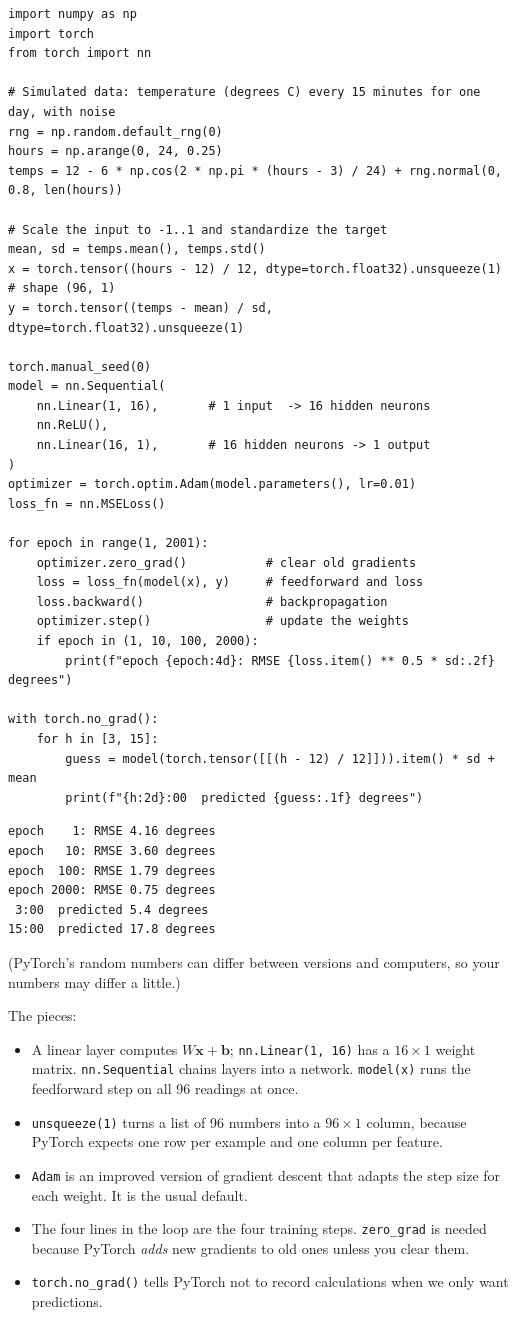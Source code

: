 \begin{verbatim}
import numpy as np
import torch
from torch import nn

# Simulated data: temperature (degrees C) every 15 minutes for one day, with noise
rng = np.random.default_rng(0)
hours = np.arange(0, 24, 0.25)
temps = 12 - 6 * np.cos(2 * np.pi * (hours - 3) / 24) + rng.normal(0, 0.8, len(hours))

# Scale the input to -1..1 and standardize the target
mean, sd = temps.mean(), temps.std()
x = torch.tensor((hours - 12) / 12, dtype=torch.float32).unsqueeze(1)   # shape (96, 1)
y = torch.tensor((temps - mean) / sd, dtype=torch.float32).unsqueeze(1)

torch.manual_seed(0)
model = nn.Sequential(
    nn.Linear(1, 16),       # 1 input  -> 16 hidden neurons
    nn.ReLU(),
    nn.Linear(16, 1),       # 16 hidden neurons -> 1 output
)
optimizer = torch.optim.Adam(model.parameters(), lr=0.01)
loss_fn = nn.MSELoss()

for epoch in range(1, 2001):
    optimizer.zero_grad()           # clear old gradients
    loss = loss_fn(model(x), y)     # feedforward and loss
    loss.backward()                 # backpropagation
    optimizer.step()                # update the weights
    if epoch in (1, 10, 100, 2000):
        print(f"epoch {epoch:4d}: RMSE {loss.item() ** 0.5 * sd:.2f} degrees")

with torch.no_grad():
    for h in [3, 15]:
        guess = model(torch.tensor([[(h - 12) / 12]])).item() * sd + mean
        print(f"{h:2d}:00  predicted {guess:.1f} degrees")
\end{verbatim}

\begin{verbatim}
epoch    1: RMSE 4.16 degrees
epoch   10: RMSE 3.60 degrees
epoch  100: RMSE 1.79 degrees
epoch 2000: RMSE 0.75 degrees
 3:00  predicted 5.4 degrees
15:00  predicted 17.8 degrees
\end{verbatim}

(PyTorch's random numbers can differ between versions and computers, so your numbers may differ a little.)

The pieces:
\begin{itemize}
\item A linear layer computes $W\mathbf{x} + \mathbf{b}$; \verb|nn.Linear(1, 16)| has a $16 \times 1$ weight
matrix. \verb|nn.Sequential| chains layers into a network. \verb|model(x)| runs the feedforward step on all 96 readings
at once.
\item \verb|unsqueeze(1)| turns a list of 96 numbers into a $96 \times 1$ column, because PyTorch expects one row per
example and one column per feature.
\item \verb|Adam| is an improved version of gradient descent that adapts the step size for each weight. It is the
usual default.
\item The four lines in the loop are the four training steps. \verb|zero_grad| is needed because PyTorch
\emph{adds} new gradients to old ones unless you clear them.
\item \verb|torch.no_grad()| tells PyTorch not to record calculations when we only want predictions.
\end{itemize}

